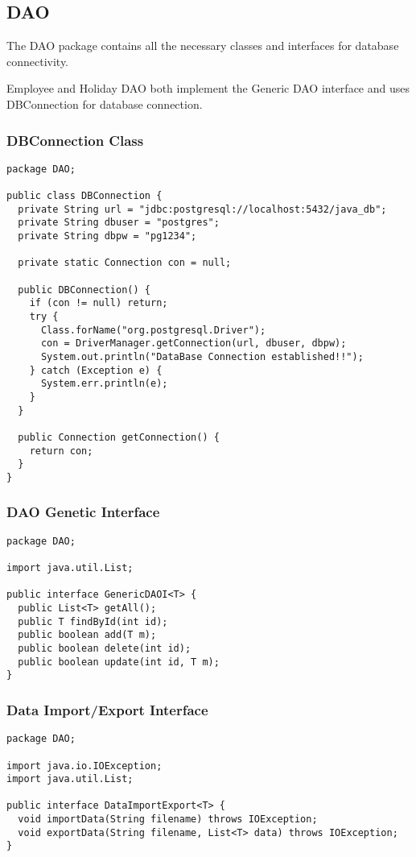 \documentclass[12pt]{article}
\begin{document}
\subsection{DAO}

The DAO package contains all the necessary classes and interfaces
for database connectivity.

Employee and Holiday DAO both implement the Generic DAO interface
and uses DBConnection for database connection.

\subsubsection{DBConnection Class}
\begin{lstlisting}
package DAO;

public class DBConnection {
  private String url = "jdbc:postgresql://localhost:5432/java_db";
  private String dbuser = "postgres";
  private String dbpw = "pg1234";

  private static Connection con = null;

  public DBConnection() {
    if (con != null) return;
    try {
      Class.forName("org.postgresql.Driver");
      con = DriverManager.getConnection(url, dbuser, dbpw);
      System.out.println("DataBase Connection established!!");
    } catch (Exception e) {
      System.err.println(e);
    }
  }

  public Connection getConnection() {
    return con;
  }
}
\end{lstlisting}

\subsubsection{DAO Genetic Interface}
\begin{lstlisting}
package DAO;

import java.util.List;

public interface GenericDAOI<T> {
  public List<T> getAll();
  public T findById(int id);
  public boolean add(T m);
  public boolean delete(int id);
  public boolean update(int id, T m);
}
\end{lstlisting}

\pagebreak

\subsubsection{Data Import/Export Interface}
\begin{lstlisting}
package DAO;

import java.io.IOException;
import java.util.List;

public interface DataImportExport<T> {
  void importData(String filename) throws IOException;
  void exportData(String filename, List<T> data) throws IOException;
}
\end{lstlisting}
\end{document}
